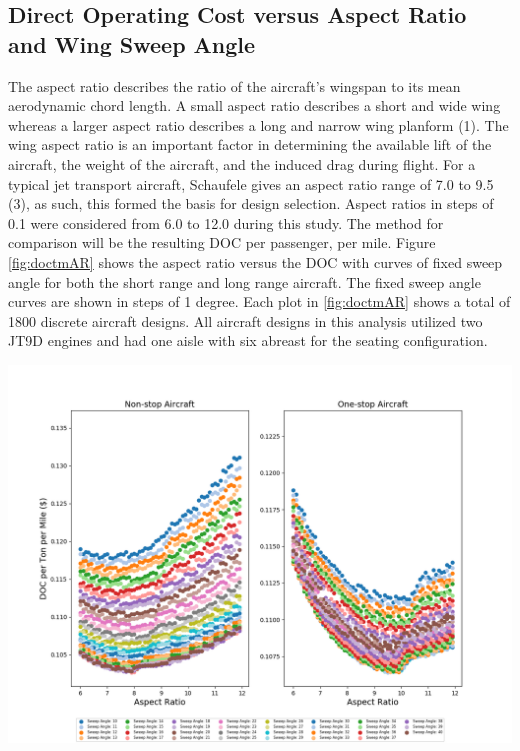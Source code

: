 \documentclass{article}
\begin{document}
    \subsection{Direct Operating Cost versus Aspect Ratio and Wing Sweep Angle}
    \label{sec:AR}
        \begin{flushleft}
            The aspect ratio describes the ratio of the aircraft's wingspan to
            its mean aerodynamic chord length. A small aspect ratio describes a
            short and wide wing whereas a larger aspect ratio describes a long
            and narrow wing planform (1). The wing aspect ratio is an important
            factor in determining the available lift of the aircraft, the weight
            of the aircraft, and the induced drag during flight. For a typical
            jet transport aircraft, Schaufele gives an aspect ratio range of 7.0
            to 9.5 (3), as such, this formed the basis for design selection. Aspect
            ratios in steps of 0.1 were considered from 6.0 to 12.0 during this
            study. The method for comparison will be the resulting DOC per
            passenger, per mile. Figure \ref{fig:doctmAR} shows the aspect ratio
            versus the DOC with curves of fixed sweep angle for both the short
            range and long range aircraft. The fixed sweep angle curves are
            shown in steps of 1 degree. Each plot in \ref{fig:doctmAR} shows a
            total of 1800 discrete aircraft designs. All aircraft designs in
            this analysis utilized two JT9D engines and had one aisle with six
            abreast for the seating configuration.
        \end{flushleft}

        \begin{center}
            \includegraphics[scale=0.50]{DOCTM v Sweep Angle.PNG}
            \label{fig:doctmAR}%
        \end{center}
\end{document}
